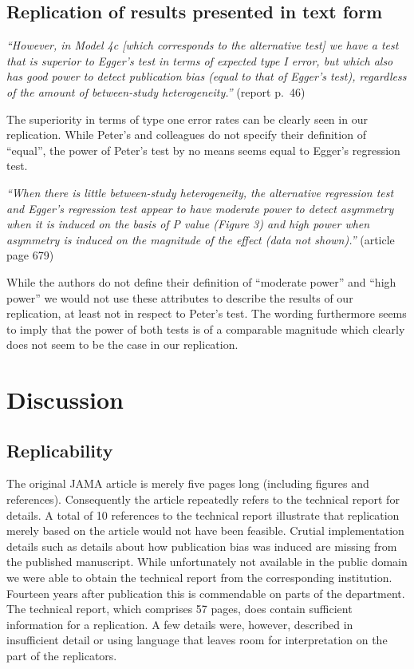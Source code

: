 \documentclass[
  english,
  doc,floatsintext,draftall]{apa6}
\begin{document}
\hypertarget{replication-of-results-presented-in-text-form}{%
\subsection{Replication of results presented in text form}\label{replication-of-results-presented-in-text-form}}

\emph{\enquote{However, in Model 4c {[}which corresponds to the alternative test{]} we have a test that is superior to Egger's test in terms of expected type I error, but which also has good power to detect publication bias (equal to that of Egger's test), regardless of the amount of between-study heterogeneity.}} (report p.~46)

The superiority in terms of type one error rates can be clearly seen in our replication.
While Peter's and colleagues do not specify their definition of \enquote{equal},
the power of Peter's test by no means seems equal to Egger's regression test.

\emph{\enquote{When there is little between-study heterogeneity, the alternative regression test and Egger's regression test appear to have moderate power to detect asymmetry when it is induced on the basis of P value (Figure 3) and high power when asymmetry is induced on the magnitude of the effect (data not shown).}} (article page 679)

While the authors do not define their definition of \enquote{moderate power} and \enquote{high power} we would not use these attributes to describe the results of our replication,
at least not in respect to Peter's test.
The wording furthermore seems to imply that the power of both tests is of a comparable magnitude which clearly does not seem to be the case in our replication.

\hypertarget{discussion}{%
\section{Discussion}\label{discussion}}

\hypertarget{replicability}{%
\subsection{Replicability}\label{replicability}}

The original JAMA article is merely five pages long (including figures and references).
Consequently the article repeatedly refers to the technical report for details.
A total of 10 references to the technical report illustrate that replication merely based on the article would not have been feasible.
Crutial implementation details such as details about how publication bias was induced are missing from the published manuscript.
While unfortunately not available in the public domain we were able to obtain the technical report from the corresponding institution.
Fourteen years after publication this is commendable on parts of the department.
The technical report, which comprises 57 pages, does contain sufficient information for a replication.
A few details were, however, described in insufficient detail or using language that leaves room for interpretation on the part of the replicators.
\end{document}
